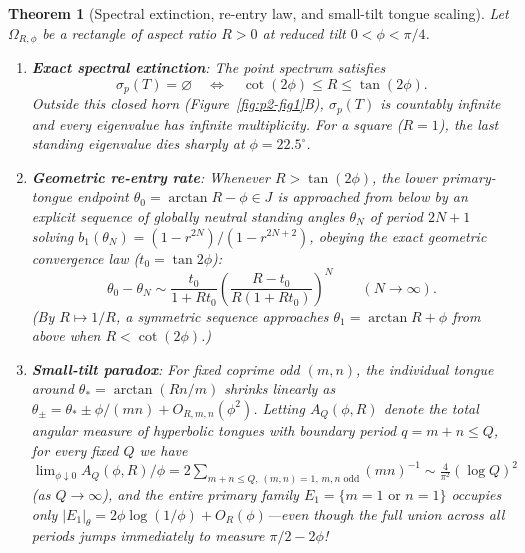\documentclass[11pt,reqno]{amsart}
\newtheorem{theorem}{Theorem}[section]
\theoremstyle{definition}
\theoremstyle{remark}
\begin{document}
\begin{theorem}[Spectral extinction, re-entry law, and small-tilt tongue scaling]\label{thm:extinction-reentry}
Let $\Omega_{R,\phi}$ be a rectangle of aspect ratio $R > 0$ at reduced tilt $0 < \phi < \pi/4$.
\begin{enumerate}
  \item \textbf{Exact spectral extinction}: The point spectrum satisfies
  \begin{equation}\label{eq:extinction}
    \sigma_p(T) = \varnothing \quad \Longleftrightarrow \quad \cot(2\phi) \le R \le \tan(2\phi).
  \end{equation}
  Outside this closed horn (Figure~\ref{fig:p2-fig1}B), $\sigma_p(T)$ is countably infinite and every eigenvalue has infinite multiplicity. For a square ($R = 1$), the last standing eigenvalue dies sharply at $\phi = 22.5^\circ$.
  \item \textbf{Geometric re-entry rate}: Whenever $R > \tan(2\phi)$, the lower primary-tongue endpoint $\theta_0 = \arctan R - \phi \in J$ is approached from below by an explicit sequence of globally neutral standing angles $\theta_N$ of period $2N+1$ solving $b_1(\theta_N) = (1 - r^{2N})/(1 - r^{2N+2})$, obeying the exact geometric convergence law ($t_0 = \tan 2\phi$):
  \begin{equation}\label{eq:reentry}
    \theta_0 - \theta_N \sim \frac{t_0}{1 + R t_0} \left( \frac{R - t_0}{R(1 + R t_0)} \right)^N \qquad (N \to \infty).
  \end{equation}
  (By $R \mapsto 1/R$, a symmetric sequence approaches $\theta_1 = \arctan R + \phi$ from above when $R < \cot(2\phi)$.)
  \item \textbf{Small-tilt paradox}: For fixed coprime odd $(m,n)$, the individual tongue around $\theta_* = \arctan(Rn/m)$ shrinks linearly as $\theta_\pm = \theta_* \pm \phi/(mn) + O_{R,m,n}(\phi^2)$. Letting $A_Q(\phi, R)$ denote the total angular measure of hyperbolic tongues with boundary period $q = m + n \le Q$, for every fixed $Q$ we have $\lim_{\phi\downarrow 0} A_Q(\phi,R)/\phi = 2\sum_{m+n\le Q,\,(m,n)=1,\,m,n\text{ odd}} (mn)^{-1} \sim \frac{4}{\pi^2}(\log Q)^2$ (as $Q \to \infty$), and the entire primary family $E_1 = \{m=1 \text{ or } n=1\}$ occupies only $|E_1|_\theta = 2\phi\log(1/\phi) + O_R(\phi)$---even though the full union across all periods jumps immediately to measure $\pi/2 - 2\phi$!
\end{enumerate}
\end{theorem}
\end{document}
